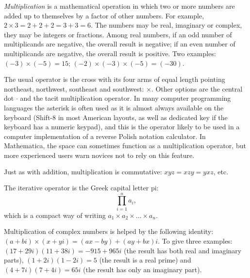\documentclass[12pt]{article}
\begin{document}
{\em Multiplication} is a mathematical operation in which two or more numbers are added up to themselves by a factor of other numbers. For example, $2 \times 3 = 2 + 2 + 2 = 3 + 3 = 6$. The numbers may be real, imaginary or complex, they may be integers or fractions. Among real numbers, if an odd number of multiplicands are negative, the overall result is negative; if an even number of multiplicands are negative, the overall result is positive. Two examples: $(-3) \times (-5) = 15$; $(-2) \times (-3) \times (-5) = (-30)$.

The usual operator is the cross with its four arms of equal length pointing northeast, northwest, southeast and southwest: $\times$. Other options are the central dot $\cdot$ and the tacit multiplication operator. In many computer programming languages the asterisk is often used as it is almost always available on the keyboard (Shift-8 in most American layouts, as well as dedicated key if the keyboard has a numeric keypad), and this is the operator likely to be used in a computer implementation of a reverse Polish notation calculator. In Mathematica, the space can sometimes function as a multiplication operator, but  more experienced users warn novices not to rely on this feature.

Just as with addition, multiplication is commutative: $xyz = xzy = yxz$, etc.

The iterative operator is the Greek capital letter pi: $$\prod_{i = 1}^n a_i,$$ which is a compact way of writing $a_1 \times a_2 \times \ldots \times a_n$.

Multiplication of complex numbers is helped by the following identity: $(a + bi) \times (x + yi)=(ax - by) + (ay + bx)i$. To give three examples: $(17 + 29i)(11 + 38i) = -915 + 965i$ (the result has both real and imaginary parts), $(1 + 2i)(1 - 2i) = 5$ (the result is a real prime) and $(4 + 7i)(7 + 4i) = 65i$ (the result has only an imaginary part).
\end{document}
